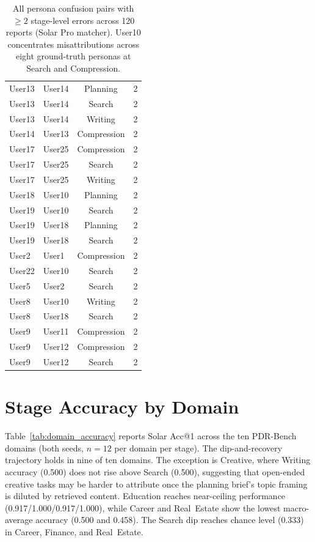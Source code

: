 \documentclass[]{article}
\begin{document}
\begin{table}[!ht]
\begin{tabular}{llcr}
User13 & User14 & Planning    & 2 \\
User13 & User14 & Search      & 2 \\
User13 & User14 & Writing     & 2 \\
User14 & User13 & Compression & 2 \\
User17 & User25 & Compression & 2 \\
User17 & User25 & Search      & 2 \\
User17 & User25 & Writing     & 2 \\
User18 & User10 & Planning    & 2 \\
User19 & User10 & Search      & 2 \\
User19 & User18 & Planning    & 2 \\
User19 & User18 & Search      & 2 \\
User2  & User1  & Compression & 2 \\
User22 & User10 & Search      & 2 \\
User5  & User2  & Search      & 2 \\
User8  & User10 & Writing     & 2 \\
User8  & User18 & Search      & 2 \\
User9  & User11 & Compression & 2 \\
User9  & User12 & Compression & 2 \\
User9  & User12 & Search      & 2 \\
\bottomrule
\end{tabular}
\caption{All persona confusion pairs with $\geq 2$ stage-level errors
  across 120 reports (Solar Pro matcher). User10 concentrates
  misattributions across eight ground-truth personas at Search and
  Compression.}
\label{tab:confusion_full}
\end{table}

\section{Stage Accuracy by Domain}
\label{app:domain}

Table~\ref{tab:domain_accuracy} reports Solar Acc@1 across the ten PDR-Bench
domains (both seeds, $n=12$ per domain per stage). The dip-and-recovery
trajectory holds in nine of ten domains. The exception is Creative, where
Writing accuracy (0.500) does not rise above Search (0.500), suggesting that
open-ended creative tasks may be harder to attribute once the planning brief's
topic framing is diluted by retrieved content. Education reaches near-ceiling
performance (0.917/1.000/0.917/1.000), while Career and Real~Estate show the
lowest macro-average accuracy (0.500 and 0.458). The Search dip reaches chance
level (0.333) in Career, Finance, and Real~Estate.
\end{document}
